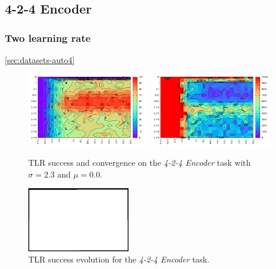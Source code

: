 \subsection{4-2-4 Encoder} 

\subsubsection{Two learning rate} 
\label{sec:tlr-auto4} 
\ref{sec:datasets-auto4} 
\begin{figure}[H]
  \centering
  \includegraphics[width=0.48\textwidth]{img/tlr-auto4-success.pdf}   
  \includegraphics[width=0.48\textwidth]{img/tlr-auto4-epoch.pdf}     
  \caption{TLR success and convergence on the \emph{4-2-4 Encoder} task with $\sigma = 2.3$ and $\mu = 0.0$.}
  \label{fig:results-tlr-auto4-performance}
\end{figure}

\begin{figure}[H]
  \centering
  \includegraphics[width=0.4\textwidth]{img/placeholder.png}      
  \caption{TLR success evolution for the \emph{4-2-4 Encoder} task.}
  \label{fig:results-tlr-auto4-epoch} 
\end{figure}


